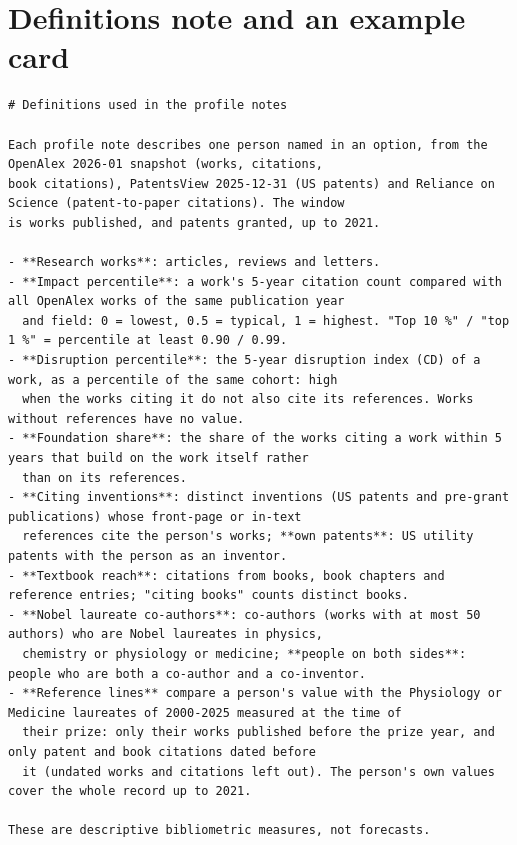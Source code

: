 \documentclass[11pt]{article}
\begin{document}
\section{Definitions note and an example card}\label{app:card}
\begin{Verbatim}
# Definitions used in the profile notes

Each profile note describes one person named in an option, from the OpenAlex 2026-01 snapshot (works, citations,
book citations), PatentsView 2025-12-31 (US patents) and Reliance on Science (patent-to-paper citations). The window
is works published, and patents granted, up to 2021.

- **Research works**: articles, reviews and letters.
- **Impact percentile**: a work's 5-year citation count compared with all OpenAlex works of the same publication year
  and field: 0 = lowest, 0.5 = typical, 1 = highest. "Top 10 %" / "top 1 %" = percentile at least 0.90 / 0.99.
- **Disruption percentile**: the 5-year disruption index (CD) of a work, as a percentile of the same cohort: high
  when the works citing it do not also cite its references. Works without references have no value.
- **Foundation share**: the share of the works citing a work within 5 years that build on the work itself rather
  than on its references.
- **Citing inventions**: distinct inventions (US patents and pre-grant publications) whose front-page or in-text
  references cite the person's works; **own patents**: US utility patents with the person as an inventor.
- **Textbook reach**: citations from books, book chapters and reference entries; "citing books" counts distinct books.
- **Nobel laureate co-authors**: co-authors (works with at most 50 authors) who are Nobel laureates in physics,
  chemistry or physiology or medicine; **people on both sides**: people who are both a co-author and a co-inventor.
- **Reference lines** compare a person's value with the Physiology or Medicine laureates of 2000-2025 measured at the time of
  their prize: only their works published before the prize year, and only patent and book citations dated before
  it (undated works and citations left out). The person's own values cover the whole record up to 2021.

These are descriptive bibliometric measures, not forecasts.
\end{Verbatim}
\end{document}
